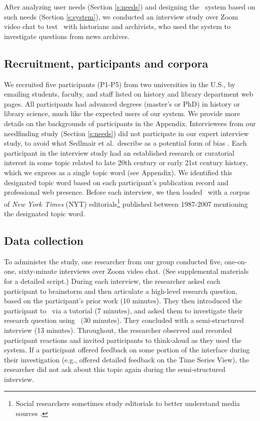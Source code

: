
After analyzing user needs (Section \ref{s:needs}) and designing the \ours~system based on such needs (Section \ref{s:system}), we conducted an interview study over Zoom video chat to test \ours~with historians and archivists, who used the system to investigate questions from news archives.

\subsection{Recruitment, participants and corpora}

We recruited five participants (P1-P5) from two universities in the U.S., by emailing students, faculty, and staff listed on history and library department web pages. 
All participants had advanced degrees (master's or PhD) in history or library science, much like the expected users of our system. 
We provide more details on the backgrounds of participants in the Appendix. Interviewees from our needfinding study (Section \ref{s:needs}) did not participate in our expert interview study, to avoid what Sedlmair et al.\ describe as a potential form of bias \cite{Sedlmair}.
Each participant in the interview study had an established research or curatorial interest in some topic related to late 20th century or early 21st century history, which we express as a single topic word (see Appendix). 
We identified this designated topic word based on each participant's publication record and professional web presence. 
Before each interview, we then loaded \ours~with a corpus of \textit{New York Times} (NYT) editorials\footnote{Social researchers sometimes study editorials to better understand media sources \cite{gay_rights,Lule}.} published between 1987-2007 \cite{SandhausNYT} mentioning the designated topic word. 


\subsection{Data collection}\label{s:datacollection}
To administer the study, one researcher from our group conducted five, one-on-one, sixty-minute interviews over Zoom video chat. 
(See supplemental materials for a detailed script.)
During each interview, the researcher asked each participant to brainstorm and then articulate a high-level research question, based on the participant's prior work (10 minutes).
They then introduced the participant to \ours~via a tutorial (7 minutes), and asked them to investigate their research question using \ours~(30 minutes). 
They concluded with a semi-structured interview (13 minutes).
Throughout, the researcher observed and recorded participant reactions and invited participants to think-aloud \cite{thinkaloud} as they used the system.
If a participant offered feedback on some portion of the interface during their investigation (e.g., offered detailed feedback on the Time Series View), the researcher did not ask about this topic again during the semi-structured interview.

